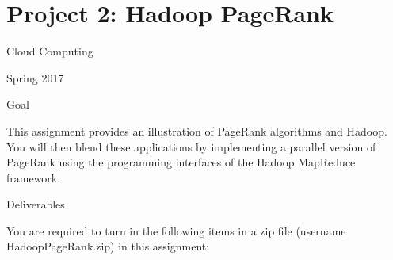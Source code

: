 \section{Project 2: Hadoop PageRank}

Cloud Computing

Spring 2017

Goal

This assignment provides an illustration of PageRank algorithms and Hadoop. You will then blend these
applications by implementing a parallel version of PageRank using the programming interfaces of the Hadoop
MapReduce framework.

Deliverables

You are required to turn in the following items in a zip file
(username HadoopPageRank.zip) in this assignment:

